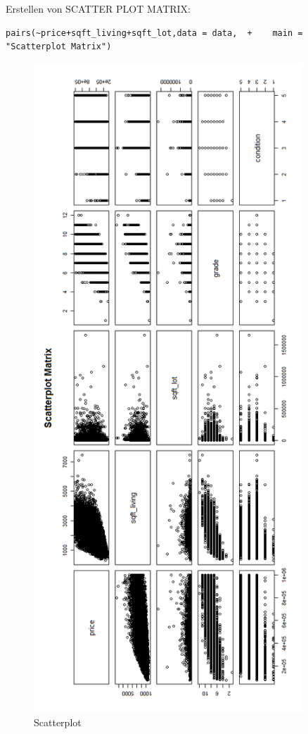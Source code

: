 Erstellen von SCATTER PLOT MATRIX:
\begin{lstlisting}
pairs(~price+sqft_living+sqft_lot,data = data,  +    main = "Scatterplot Matrix")
\end{lstlisting}

\begin{figure}[!htb]
        \begin{minipage}{1\textwidth}
                \centering
                \includegraphics[width=0.90\textwidth]{pics/tutor6.png}\par\vspace{0cm}
                \caption{Scatterplot}
                \label{fig:tutor6}
        \end{minipage}
\end{figure}

